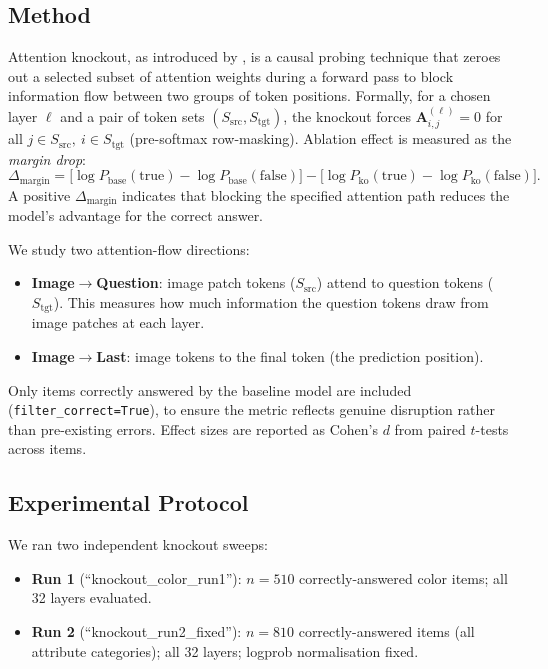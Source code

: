 \documentclass[11pt,a4paper]{article}
\begin{document}
\subsection{Method}

Attention knockout, as introduced by \citet{crossmodal2024}, is a causal probing technique that
zeroes out a selected subset of attention weights during a forward pass to block information flow
between two groups of token positions.
Formally, for a chosen layer $\ell$ and a pair of token sets $(S_{\mathrm{src}},
S_{\mathrm{tgt}})$, the knockout forces $\mathbf{A}^{(\ell)}_{i,j} = 0$ for all $j \in
S_{\mathrm{src}},\ i \in S_{\mathrm{tgt}}$ (pre-softmax row-masking).
Ablation effect is measured as the \emph{margin drop}:
\begin{equation}
  \Delta_{\mathrm{margin}} = \bigl[\log P_{\mathrm{base}}(\text{true}) - \log P_{\mathrm{base}}(\text{false})\bigr]
  - \bigl[\log P_{\mathrm{ko}}(\text{true}) - \log P_{\mathrm{ko}}(\text{false})\bigr].
  \label{eq:margin_drop}
\end{equation}
A positive $\Delta_{\mathrm{margin}}$ indicates that blocking the specified attention path reduces
the model's advantage for the correct answer.

We study two attention-flow directions:
\begin{itemize}[noitemsep]
  \item \textbf{Image$\to$Question}: image patch tokens ($S_{\mathrm{src}}$) attend to question
    tokens ($S_{\mathrm{tgt}}$). This measures how much information the question tokens draw from
    image patches at each layer.
  \item \textbf{Image$\to$Last}: image tokens to the final token (the prediction position).
\end{itemize}

Only items correctly answered by the baseline model are included (\texttt{filter\_correct=True}),
to ensure the metric reflects genuine disruption rather than pre-existing errors.
Effect sizes are reported as Cohen's $d$ from paired $t$-tests across items.

\subsection{Experimental Protocol}

We ran two independent knockout sweeps:

\begin{itemize}[noitemsep]
  \item \textbf{Run 1} (``knockout\_color\_run1''): $n = 510$ correctly-answered color items;
    all 32 layers evaluated.
  \item \textbf{Run 2} (``knockout\_run2\_fixed''): $n = 810$ correctly-answered items
    (all attribute categories); all 32 layers; logprob normalisation fixed.
\end{itemize}
\end{document}

